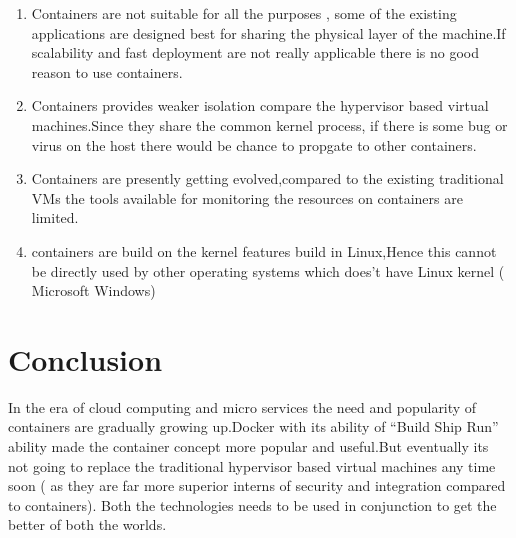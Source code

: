 \documentclass[9pt,twocolumn,twoside]{../../styles/osajnl}
\begin{document}
\begin{enumerate}
\item Containers are not suitable for all the purposes , some of the
  existing applications are designed best for sharing the physical
  layer of the machine.If scalability and fast deployment are not
  really applicable there is no good reason to use containers. \cite{www-search}  
\item Containers provides weaker isolation compare the hypervisor
  based virtual machines.Since they share the common kernel process,
  if there is some bug or virus on the host there would be chance to
  propgate to other containers. \cite{www-search}
\item Containers are presently getting evolved,compared to the
  existing traditional VMs the tools available for monitoring the
  resources on containers are limited. \cite{www-search}

\item containers are build on the kernel features build in Linux,Hence
  this cannot be directly used by other operating systems which does't
  have Linux kernel ( Microsoft Windows) 
\end{enumerate}

\section{Conclusion} 
In the era of cloud computing and micro services the need and
popularity of containers are gradually growing up.Docker with its
ability of “Build Ship Run” \cite{www-docker} ability made the container concept
more popular and useful.But eventually its not going to replace the
traditional hypervisor based virtual machines any time soon ( as they
are far more superior interns of security and integration compared to
containers). Both the technologies needs to be used in conjunction to
get the better of both the worlds. 



 
\newpage

\appendix
\end{document}
